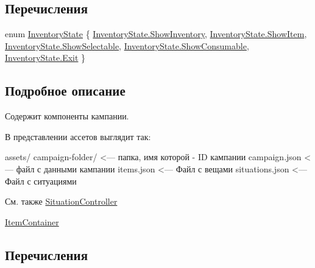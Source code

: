 \subsection*{Перечисления}
\begin{DoxyCompactItemize}
\item 
enum \hyperlink{namespace_a_s_c_i_i_wars_1_1_game_a38949febfe4ff7d83568273830f42e5a}{Inventory\+State} \{ \newline
\hyperlink{namespace_a_s_c_i_i_wars_1_1_game_a38949febfe4ff7d83568273830f42e5aa5e035f78e07eda1a93846b8ea0e9589b}{Inventory\+State.\+Show\+Inventory}, 
\hyperlink{namespace_a_s_c_i_i_wars_1_1_game_a38949febfe4ff7d83568273830f42e5aafb91889eb4e48cf1ecb2b6f39405d724}{Inventory\+State.\+Show\+Item}, 
\hyperlink{namespace_a_s_c_i_i_wars_1_1_game_a38949febfe4ff7d83568273830f42e5aa011a738f4f78ce6394f16784769a82c4}{Inventory\+State.\+Show\+Selectable}, 
\hyperlink{namespace_a_s_c_i_i_wars_1_1_game_a38949febfe4ff7d83568273830f42e5aad522e5cef00735497c26885b05b6ad60}{Inventory\+State.\+Show\+Consumable}, 
\newline
\hyperlink{namespace_a_s_c_i_i_wars_1_1_game_a38949febfe4ff7d83568273830f42e5aafef46e5063ce3dc78b8ae64fa474241d}{Inventory\+State.\+Exit}
 \}
\end{DoxyCompactItemize}


\subsection{Подробное описание}
Содержит компоненты кампании. 

В представлении ассетов выглядит так\+:


\begin{DoxyCode}
assets/
    campaign-folder/      <--- папка, имя которой - ID кампании
        campaign.json     <--- файл с данными кампании
        items.json        <--- Файл с вещами
        situations.json   <--- Файл с ситуациями
\end{DoxyCode}


\begin{DoxySeeAlso}{См. также}
\hyperlink{interface_a_s_c_i_i_wars_1_1_game_1_1_situation_controller}{Situation\+Controller} 

\hyperlink{class_a_s_c_i_i_wars_1_1_game_1_1_item_container}{Item\+Container} 
\end{DoxySeeAlso}


\subsection{Перечисления}
\hypertarget{namespace_a_s_c_i_i_wars_1_1_game_a38949febfe4ff7d83568273830f42e5a}{}\label{namespace_a_s_c_i_i_wars_1_1_game_a38949febfe4ff7d83568273830f42e5a} 
